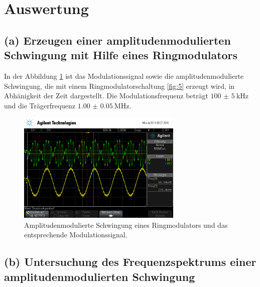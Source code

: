 \section{Auswertung}
\label{sec:Auswertung}


\subsection{(a) Erzeugen einer amplitudenmodulierten Schwingung mit
Hilfe eines Ringmodulators}
\label{subsec:auswertung_a}
In der Abbildung \ref{fig:ringamp_zeit} ist das Modulationssignal
sowie die amplitudenmodulierte Schwingung, die mit einem Ringmodulatorschaltung \ref{fig:5}
erzeugt wird,
in Abhänigkeit der Zeit dargestellt.
Die Modulationsfrequenz beträgt $\SI{100(5)}{\kilo\hertz}$
und die Trägerfrequenz $\SI{1.00(5)}{\mega\hertz}$.

\begin{figure}
  \centering
  \includegraphics[width=0.7\textwidth]{osci/amp_ringmodulator.png}
  \caption{Amplitudenmodulierte
  Schwingung eines Ringmodulators und das entsprechende Modulationssignal.}
  \label{fig:ringamp_zeit}
\end{figure}


\subsection{(b) Untersuchung des Frequenzspektrums einer
amplitudenmodulierten Schwingung}
\label{subsec:auswertung_b}

